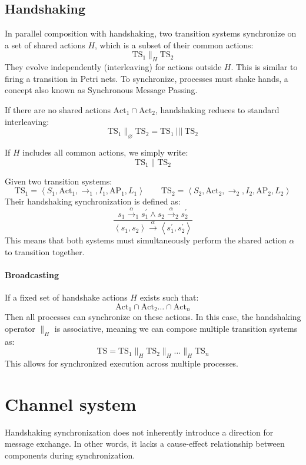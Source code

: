 \subsection{Handshaking}
In parallel composition with handshaking, two transition systems synchronize on a set of shared actions $H$, which is a subset of their common actions:
\[\text{TS}_1 \parallel_H \text{TS}_2\]    
They evolve independently (interleaving) for actions outside $H$.
This is similar to firing a transition in Petri nets.
To synchronize, processes must shake hands, a concept also known as Synchronous Message Passing.

If there are no shared actions $\text{Act}_1\cap \text{Act}_2$, handshaking reduces to standard interleaving:
\[\text{TS}_1\parallel_{\varnothing}\text{TS}_2=\text{TS}_1\:|||\:\text{TS}_2\]

If $H$ includes all common actions, we simply write:
\[\text{TS}_1\parallel\text{TS}_2\]

Given two transition systems:
\[\text{TS}_1=\left\langle S_1, \text{Act}_1, \rightarrow_1, I_1,\text{AP}_1, L_1\right\rangle \qquad \text{TS}_2=\left\langle S_2, \text{Act}_2, \rightarrow_2, I_2,\text{AP}_2, L_2\right\rangle\]    
Their handshaking synchronization is defined as: 
\[\dfrac{s_1\overset{\alpha}{\rightarrow}_1s_1^\prime\land s_2\overset{\alpha}{\rightarrow}_2s_2^\prime}{\left\langle s_1,s_2\right\rangle \overset{\alpha}{\rightarrow}\left\langle s_1^\prime,s_2^\prime\right\rangle}\]
This means that both systems must simultaneously perform the shared action $\alpha$ to transition together.

\paragraph*{Broadcasting}
If a fixed set of handshake actions $H$ exists such that: 
\[\text{Act}_1\cap \text{Act}_2 \dots \cap \text{Act}_n\]
Then all processes can synchronize on these actions.
In this case, the handshaking operator $\parallel_H$ is associative, meaning we can compose multiple transition systems as:
\[\text{TS}=\text{TS}_1\parallel_H\text{TS}_2\parallel_H\dots \parallel_H\text{TS}_n\]
This allows for synchronized execution across multiple processes.

\section{Channel system}
Handshaking synchronization does not inherently introduce a direction for message exchange. 
In other words, it lacks a cause-effect relationship between components during synchronization.

